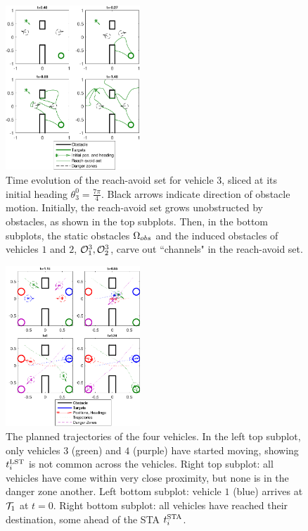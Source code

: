 \begin{figure}
	\centering
	\includegraphics[width=0.45\textwidth]{"fig/dubins_reach_3"}
	\caption{Time evolution of the reach-avoid set for vehicle $3$, sliced at its initial heading $\theta_3^0=\frac{7\pi}{4}$. Black arrows indicate direction of obstacle motion. Initially, the reach-avoid set grows unobstructed by obstacles, as shown in the top subplots. Then, in the bottom subplots, the static obstacles $\Omega_{obs}$ and the induced obstacles of vehicles $1$ and $2$, $\mathcal{O}^3_1,\mathcal{O}^3_2$, carve out ``channels" in the reach-avoid set.}
	\label{fig:dubins_reach_3}
\end{figure}

\begin{figure}
	\centering
	\includegraphics[width=0.45\textwidth]{"fig/dubins_result"}
	\caption{The planned trajectories of the four vehicles. In the left top subplot, only vehicles $3$ (green) and $4$ (purple) have started moving, showing $t^{\text{LST}}_i$ is not common across the vehicles. Right top subplot: all vehicles have come within very close proximity, but none is in the danger zone another. Left bottom subplot: vehicle $1$ (blue) arrives at $\mathcal{T}_1$ at $t=0$. Right bottom subplot: all vehicles have reached their destination, some ahead of the STA $t^{\text{STA}}_i$.}
	\label{fig:dubins_result}
\end{figure}